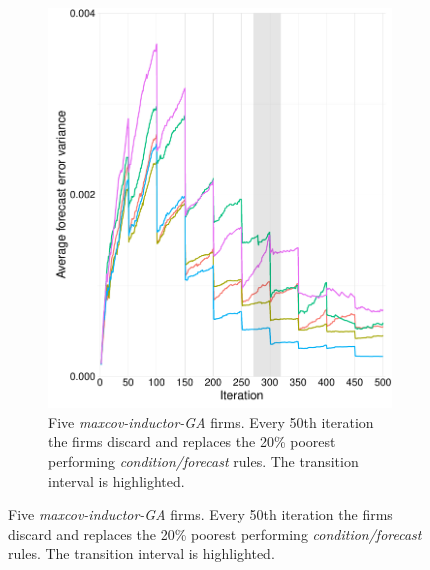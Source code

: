 \documentclass[preprint, 12pt]{elsarticle}
\begin{document}
\begin{figure}[hb!]
\begin{subfigure}[t]{0.485\textwidth}
		\includegraphics[width=\textwidth, trim={4mm 0 0 0}]{Graphics/fig6a_miga.pdf}
		\caption{Five \emph{maxcov-inductor-GA} firms. Every 50th iteration the firms discard and replaces the 20\% poorest performing \emph{condition/forecast} rules. The transition interval is highlighted.}
		\label{fig:accuracy_mi}
	\end{subfigure}
	
	\label{fig:accuracy}
\end{figure}
\end{document}
